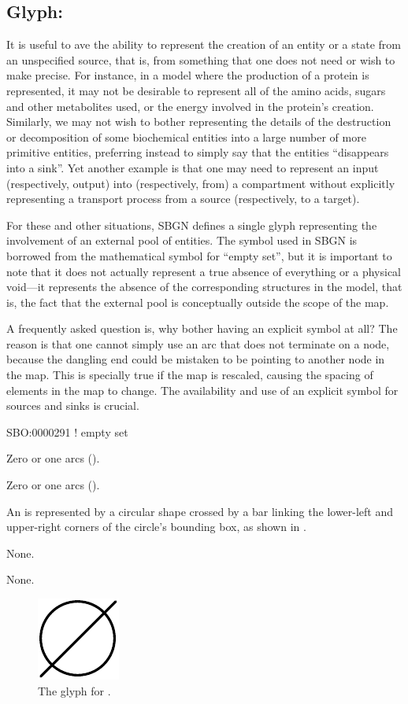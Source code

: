 \subsection{Glyph: }
\label{sec:emptySet}

It is useful to ave the ability to represent the creation of an entity or a state from an unspecified source, that is, from something that one does not need or wish to make precise.  For instance, in a model where the production of a protein is represented, it may not be desirable to represent all of the amino acids, sugars and other metabolites used, or the energy involved in the protein's creation.
Similarly, we may not wish to bother representing the details of the destruction or decomposition of some biochemical entities into a large number of more primitive entities, preferring instead to simply say that the entities ``disappears into a sink''.
Yet another example is that one may need to represent an input (respectively, output) into (respectively, from) a compartment without explicitly representing a transport process from a source (respectively, to a target).

For these and other situations, SBGN defines a single glyph representing the involvement of an external pool of entities.
The symbol used in SBGN is borrowed from the mathematical symbol for ``empty set'', but it is important to note that it does not actually represent a true absence of everything or a physical void---it represents the absence of the corresponding structures in the model, that is, the fact that the external pool is conceptually outside the scope of the map.

A frequently asked question is, why bother having an explicit symbol at all?
The reason is that one cannot simply use an arc that does not terminate on a node, because the dangling end could be mistaken to be pointing to another node in the map.  This is specially true if the map is rescaled, causing the spacing of elements in the map to change.
The availability and use of an explicit symbol for sources and sinks is crucial.

\begin{glyphDescription}

\glyphSboTerm
SBO:0000291 ! empty set

\glyphIncoming
Zero or one  arcs ().

\glyphOutgoing
Zero or one  arcs ().

\glyphContainer
An  is represented by a circular shape crossed by a bar linking the lower-left and upper-right corners of the circle's bounding box, as shown in .

\glyphLabel
None.

\glyphAux
None.

\end{glyphDescription}

\begin{figure}[H]
  \centering
  \includegraphics{images/build/empty_set.pdf}
  \caption{The \PD glyph for .}
  \label{fig:emptySet}
\end{figure}
